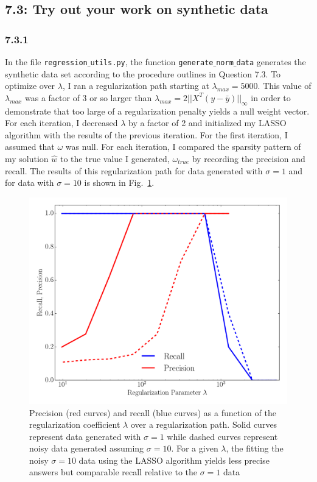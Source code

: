 \documentclass[12pt]{amsart}
\begin{document}
\subsection*{7.3: Try out your work on synthetic data}

\subsubsection*{7.3.1}

In the file {\tt regression$\_$utils.py}, the function {\tt generate$\_$norm$\_$data} generates the synthetic data set according to the procedure outlines in Question 7.3.  To optimize over $\lambda$, I ran a regularization path starting at $\lambda_{max} = 5000$.  This value of  $\lambda_{max}$ was a factor of 3 or so larger than $\lambda_{max} = 2 ||X^{T}(y - \bar{y}) ||_{\infty}$ in order to demonstrate that too large of a regularization penalty yields a null weight vector.  For each iteration, I decreased $\lambda$ by a factor of 2 and initialized my LASSO algorithm with the results of the previous iteration.  For the first iteration, I assumed that $\omega$ was null.  For each iteration, I compared the sparsity pattern of my solution $\hat{w}$ to the true value I generated, $\omega_{true}$ by recording the precision and recall. The results of this regularization path for data generated with $\sigma = 1$ and for data with $\sigma = 10$ is shown in Fig.~\ref{fig:synth_reg}.

\begin{figure}
	\includegraphics[width=\columnwidth]{synthetic_prec_rec.pdf}
    \caption{Precision (red curves) and recall (blue curves) as a function of the regularization coefficient $\lambda$ over a regularization path.  Solid curves represent data generated with $\sigma = 1$ while dashed curves represent noisy data generated assuming $\sigma = 10$.  For a given $\lambda$, the fitting the noisy $\sigma = 10$ data using the LASSO algorithm yields less precise answers but comparable recall relative to the $\sigma = 1$ data}
    \label{fig:synth_reg}
\end{figure}
\end{document}

